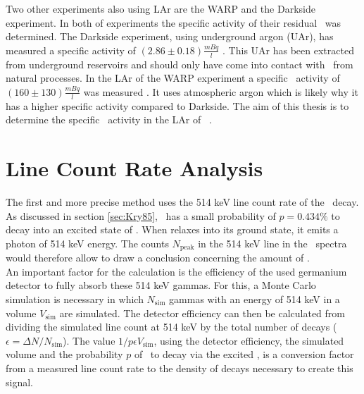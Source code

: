 \documentclass[encoding=utf8,british]{tumphthesis}
\begin{document}
Two other experiments also using LAr are the WARP and the Darkside experiment.
In both of experiments the specific activity of their residual \Kr\ was determined.
The Darkside experiment, using underground argon (UAr), has measured a specific activity of \((2.86\pm0.18) \frac{\unit{mBq}} {\unit{l}}\)  \cite{agnes_results_2016}.
This UAr has been extracted from underground reservoirs and should only have come into contact with \Kr\ from natural processes.
In the LAr of the WARP experiment a specific \Kr\ activity of   \((160\pm130)\frac{\unit{mBq}}{\unit{l}}\) was measured \cite{benetti_measurement_2006}.
It uses atmospheric argon which is likely why it has a higher specific activity compared to Darkside.
The aim of this thesis is to determine the specific \Kr\ activity in the LAr of \gerda\ \PII.

 
\chapter{Line Count Rate Analysis}
\label{sec:SAfrom514}

The first and more precise method uses the 514 keV line count rate of the \Kr\ decay.
As discussed in section \ref{sec:Kry85}, \Kr\ has a small probability of $p=0.434\%$ to decay into an excited state of . 
When  relaxes into its ground state, it emits a photon of 514 keV energy.
The counts $N_{\mathrm{peak}}$ in the 514 keV line in the \gerda\ spectra would therefore allow to draw a conclusion concerning the amount of \Kr. 
\\

An important factor for the calculation is the efficiency of the used germanium detector to fully absorb these 514 keV gammas.
For this, a Monte Carlo simulation is necessary in which $N_{\mathrm{sim}}$ gammas with an energy of 514 keV  in a  volume $V_{\mathrm{sim}}$ are simulated.
The detector efficiency can then be calculated from dividing the simulated line count at 514 keV by the total number of  decays ($\epsilon = \Delta N/N_{\mathrm{sim}}$).
The value $1/p \epsilon V_{\mathrm{sim}}$, using the detector efficiency, the simulated volume and the probability $p$ of \Kr\ to decay via the excited , is a conversion factor from a measured line count rate to the density of decays necessary to create this signal.
\\
\end{document}
